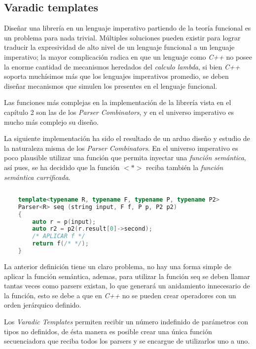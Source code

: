 	\subsection{Varadic templates}
	Diseñar una librería en un lenguaje imperativo partiendo de la teoría funcional es un problema para nada trivial. Múltiples soluciones pueden existir para lograr traducir la expresividad de alto nivel de un lenguaje funcional a un lenguaje imperativo; la mayor complicación radica en que un lenguaje como \emph{C++} no posee la enorme cantidad de mecanismos heredados del \emph{calculo lambda}, si bien \emph{C++} soporta muchísimos más que los lenguajes imperativos promedio, se deben diseñar mecanismos que simulen los presentes en el lenguaje funcional. 

	Las funciones más complejas en la implementación de la librería vista en el capítulo 2 son las de los \emph{Parser Combinators}, y en el universo imperativo es mucho más complejo su diseño.
	
	La siguiente implementación ha sido el resultado de un arduo diseño y estudio de la naturaleza misma de los \emph{Parser Combinators}. En el universo imperativo es poco plausible utilizar una función que permita inyectar una \emph{función semántica}, así pues, se ha decidido que la función $<*>$ reciba también la \emph{función semántica currificada}.
	
	\begin{lstlisting}[language=C++, caption=función secuenciadora en C++]
	
	template<typename R, typename F, typename P, typename P2>
	Parser<R> seq (string input, F f, P p, P2 p2)
	{
		auto r = p(input);
		auto r2 = p2(r.result[0]->second);
		/* APLICAR f */
		return f(/* */);
	}	
	\end{lstlisting}
	
	La anterior definición tiene un claro problema, no hay una forma simple de aplicar la función semántica, ademas, para utilizar la función seq se deben llamar tantas veces como parsers existan, lo que generará un anidamiento innecesario de la función, esto se debe a que en \emph{C++} no se pueden crear operadores con un orden jerárquico definido.
	
	Los \emph{Varadic Templates} permiten recibir un número indefinido de parámetros con tipos no definidos, de ésta manera es posible crear una única función secuenciadora que reciba todos los parsers y se encargue de utilizarlos uno a uno.
	
